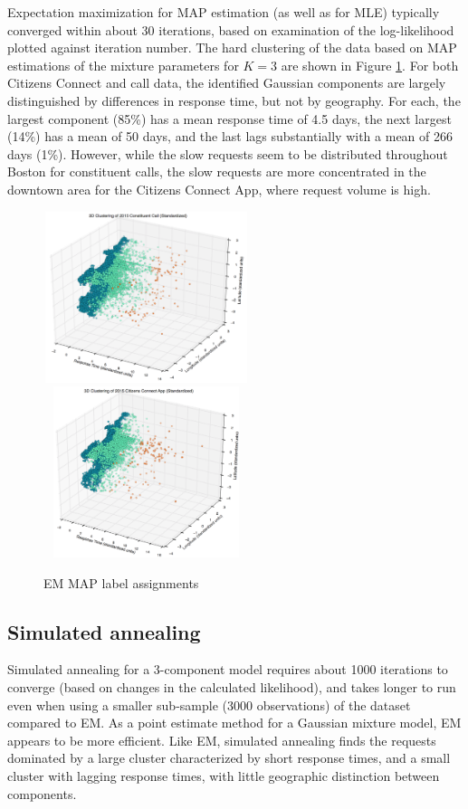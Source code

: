 \documentclass[twoside]{article}
\theoremstyle{theorem}
\theoremstyle{theorem}
\theoremstyle{theorem}
\theoremstyle{lemma}
\theoremstyle{definition}
\theoremstyle{example}
\begin{document}
Expectation maximization for MAP estimation (as well as for MLE) typically converged within about 30 iterations, based on examination of the log-likelihood plotted against iteration number. The hard clustering of the data based on MAP estimations of the mixture parameters for $K=3$ are shown in Figure \ref{EMlabels}. For both Citizens Connect and call data, the identified Gaussian components are largely distinguished by differences in response time, but not by geography. For each, the largest component (85\%) has a mean response time of 4.5 days, the next largest (14\%) has a mean of 50 days, and the last lags substantially with a mean of 266 days (1\%). However, while the slow requests seem to be distributed throughout Boston for constituent calls, the slow requests are more concentrated in the downtown area for the Citizens Connect App, where request volume is high.
\begin{figure}[h!]
\begin{center}
\includegraphics[width=60mm, height=50mm]{3D_call}
\includegraphics[width=60mm, height=50mm]{3D_app}
\caption{EM MAP label assignments}
\label{EMlabels}
\end{center}
\end{figure}

\subsection{Simulated annealing}
Simulated annealing for a 3-component model requires about 1000 iterations to converge (based on changes in the calculated likelihood), and takes longer to run even when using a smaller sub-sample (3000 observations) of the dataset compared to EM. As a point estimate method for a Gaussian mixture model, EM appears to be more efficient. Like EM, simulated annealing finds the requests dominated by a large cluster characterized by short response times, and a small cluster with lagging response times, with little geographic distinction between components. 
\end{document}
